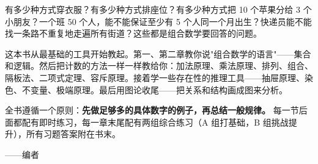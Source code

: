 \documentclass[a4paper,12pt]{ctexart}
\begin{document}
有多少种方式穿衣服？有多少种方式排座位？有多少种方式把 10 个苹果分给 3 个小朋友？一个班 50 个人，能不能保证至少有 5 个人同一个月出生？快递员能不能找一条路不重复地走遍所有街道？这些都是组合数学要回答的问题。

这本书从最基础的工具开始教起。第一、第二章教你说"组合数学的语言"——集合和逻辑。然后把计数的方法一样一样教给你：加法原理、乘法原理、排列、组合、隔板法、二项式定理、容斥原理。接着学一些存在性的推理工具——抽屉原理、染色、不变量、极端原理。最后用图论收尾——把关系和结构画成图来分析。

全书遵循一个原则：\textbf{先做足够多的具体数字的例子，再总结一般规律。} 每一节后面都配有即时练习，每一章末尾配有两组综合练习（A 组打基础，B 组挑战提升），所有习题答案附在书末。

\begin{flushright}——编者\end{flushright}

\newpage

\tableofcontents
\newpage












\end{document}
